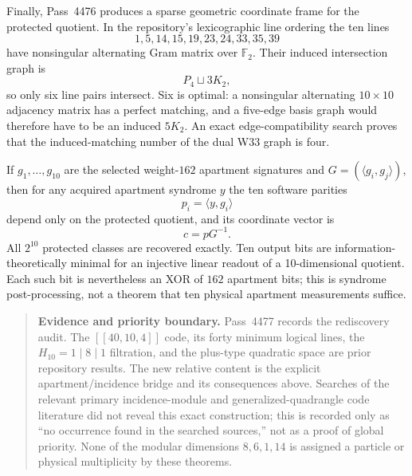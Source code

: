 Finally, Pass~4476 produces a sparse geometric coordinate frame for the
protected quotient.  In the repository's lexicographic line ordering the ten
lines
\[
 \boxed{1,5,14,15,19,23,24,33,35,39}
\]
have nonsingular alternating Gram matrix over $\mathbb F_2$.  Their induced
intersection graph is
\[
 \boxed{P_4\sqcup3K_2,}
\]
so only six line pairs intersect.  Six is optimal: a nonsingular alternating
$10\times10$ adjacency matrix has a perfect matching, and a five-edge basis
graph would therefore have to be an induced $5K_2$.  An exact edge-compatibility
search proves that the induced-matching number of the dual W33 graph is four.

If $g_1,\ldots,g_{10}$ are the selected weight-$162$ apartment signatures and
$G=(\langle g_i,g_j\rangle)$, then for any acquired apartment syndrome $y$ the
ten software parities
\[
 p_i=\langle y,g_i\rangle
\]
depend only on the protected quotient, and its coordinate vector is
\[
 \boxed{c=pG^{-1}.}
\]
All $2^{10}$ protected classes are recovered exactly.  Ten output bits are
information-theoretically minimal for an injective linear readout of a
10-dimensional quotient.  Each such bit is nevertheless an XOR of $162$
apartment bits; this is syndrome post-processing, not a theorem that ten
physical apartment measurements suffice.

\begin{quote}\small
\textbf{Evidence and priority boundary.}
Pass~4477 records the rediscovery audit.  The $[[40,10,4]]$ code, its forty
minimum logical lines, the $H_{10}=1\mid8\mid1$ filtration, and the plus-type
quadratic space are prior repository results.  The new relative content is the
explicit apartment/incidence bridge and its consequences above.  Searches of
the relevant primary incidence-module and generalized-quadrangle code
literature did not reveal this exact construction; this is recorded only as
``no occurrence found in the searched sources,'' not as a proof of global
priority.  None of the modular dimensions $8,6,1,14$ is assigned a particle or
physical multiplicity by these theorems.
\end{quote}
